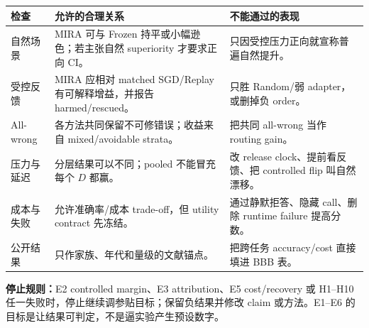 \documentclass[10pt,letterpaper]{article}
\newcommand{\sect}[1]{\vspace{4pt}{\large\bfseries\color{GuideBlue}#1}\par\vspace{2pt}}
\newenvironment{clean}{\begin{center}\fontsize{8.55}{10.05}\selectfont\setlength{\tabcolsep}{3.7pt}\renewcommand{\arraystretch}{1.04}}{\end{center}}
\begin{document}
\sect{9. 结果合理性和失败规则}
\begin{clean}
\begin{tabular}{@{}p{.15\linewidth}p{.39\linewidth}p{.34\linewidth}@{}}
\toprule
检查 & 允许的合理关系 & 不能通过的表现\\
\midrule
自然场景 & MIRA 可与 Frozen 持平或小幅逊色；若主张自然 superiority 才要求正向 CI。 & 只因受控压力正向就宣称普遍自然提升。\\
受控反馈 & MIRA 应相对 matched SGD/Replay 有可解释增益，并报告 harmed/rescued。 & 只胜 Random/弱 adapter，或删掉负 order。\\
All-wrong & 各方法共同保留不可修错误；收益来自 mixed/avoidable strata。 & 把共同 all-wrong 当作 routing gain。\\
压力与延迟 & 分层结果可以不同；pooled 不能冒充每个 $D$ 都赢。 & 改 release clock、提前看反馈、把 controlled flip 叫自然漂移。\\
成本与失败 & 允许准确率/成本 trade-off，但 utility contract 先冻结。 & 通过静默拒答、隐藏 call、删除 runtime failure 提高分数。\\
公开结果 & 只作家族、年代和量级的文献锚点。 & 把跨任务 accuracy/cost 直接填进 BBB 表。\\
\bottomrule
\end{tabular}
\end{clean}
\textbf{停止规则：}E2 controlled margin、E3 attribution、E5 cost/recovery 或 H1--H10 任一失败时，停止继续调参贴目标；保留负结果并修改 claim 或方法。E1--E6 的目标是让结果可判定，不是逼实验产生预设数字。
\end{document}
